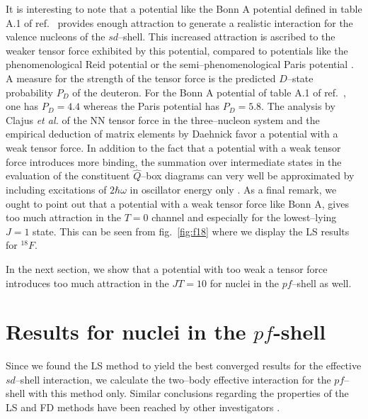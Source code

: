 It is interesting to note that a potential like the Bonn A potential
defined in table A.1 of ref.\ \cite{mac89} provides enough attraction to generate
a realistic interaction for the valence nucleons of the $sd$--shell. This 
increased attraction is ascribed to the weaker tensor force exhibited by
this potential, compared to potentials like the phenomenological Reid potential
\cite{reid68} or the semi--phenomenological Paris potential \cite{paris80}.
A measure for the strength of the tensor force
is the predicted $D$--state probability
$P_D$ of the deuteron. For the Bonn A potential of table A.1 of ref.\ \cite{mac89},
one has $P_D = 4.4$ whereas the Paris potential has $P_D =5.8$.  The analysis
by Clajus {\em et al.} \cite{clajus90} of the NN tensor force in the
three--nucleon system and the empirical deduction of matrix elements by
Daehnick \cite{daen83} favor
a potential with a weak tensor force. In addition
to the fact that a potential with a weak tensor force introduces more binding,
the summation over intermediate states in the evaluation of the constituent
$\hat{Q}$--box diagrams can very well be approximated by including excitations
of $2\hbar\omega$ in oscillator energy only \cite{ms92,sommer}.
As a final remark, we ought to point out that a potential with a weak tensor force
like Bonn A, gives too much attraction in the $T=0$ channel and especially for the
lowest--lying $J=1$ state. This can be seen from fig.\ \ref{fig:f18} where we display
the LS results for $^{18}F$.

In the next section, we show that a potential with too weak a tensor force
introduces too much attraction in the $JT=10$ for nuclei in the $pf$--shell
as well.

\section{Results for nuclei in the $pf$-shell}
Since we found the LS method to yield the best converged results for the
effective $sd$--shell interaction, we calculate the two--body effective interaction
for the $pf$--shell with this method only. Similar conclusions regarding
the properties of the LS and FD methods have been reached by other investigators
\cite{skd83,mpk85,hok92}.

